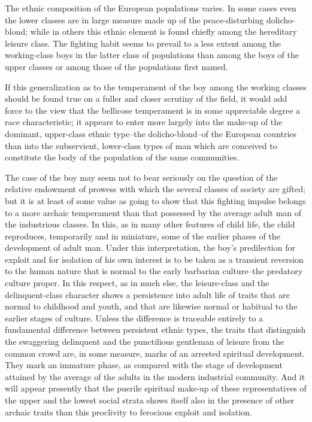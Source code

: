 \documentclass[12pt]{report}
\begin{document}
The ethnic composition of the European populations varies. In some
cases even the lower classes are in large measure made up of the
peace-disturbing dolicho-blond; while in others this ethnic element is
found chiefly among the hereditary leisure class. The fighting habit
seems to prevail to a less extent among the working-class boys in the
latter class of populations than among the boys of the upper classes or
among those of the populations first named.

If this generalization as to the temperament of the boy among the
working classes should be found true on a fuller and closer scrutiny of
the field, it would add force to the view that the bellicose temperament
is in some appreciable degree a race characteristic; it appears to
enter more largely into the make-up of the dominant, upper-class
ethnic type--the dolicho-blond--of the European countries than into the
subservient, lower-class types of man which are conceived to constitute
the body of the population of the same communities.

The case of the boy may seem not to bear seriously on the question of
the relative endowment of prowess with which the several classes of
society are gifted; but it is at least of some value as going to show
that this fighting impulse belongs to a more archaic temperament than
that possessed by the average adult man of the industrious classes. In
this, as in many other features of child life, the child reproduces,
temporarily and in miniature, some of the earlier phases of the
development of adult man. Under this interpretation, the boy's
predilection for exploit and for isolation of his own interest is to be
taken as a transient reversion to the human nature that is normal to the
early barbarian culture--the predatory culture proper. In this respect,
as in much else, the leisure-class and the delinquent-class character
shows a persistence into adult life of traits that are normal to
childhood and youth, and that are likewise normal or habitual to the
earlier stages of culture. Unless the difference is traceable entirely
to a fundamental difference between persistent ethnic types, the traits
that distinguish the swaggering delinquent and the punctilious gentleman
of leisure from the common crowd are, in some measure, marks of an
arrested spiritual development. They mark an immature phase, as compared
with the stage of development attained by the average of the adults in
the modern industrial community. And it will appear presently that the
puerile spiritual make-up of these representatives of the upper and the
lowest social strata shows itself also in the presence of other archaic
traits than this proclivity to ferocious exploit and isolation.
\end{document}
